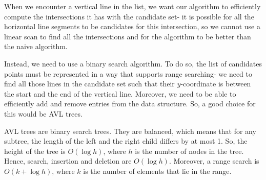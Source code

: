 \documentclass[a4paper, openany]{memoir}
\begin{document}
\begin{figure}[H]
    \centering
\end{figure}

When we encounter a vertical line in the list, we want our algorithm to efficiently compute the intersections it has with the candidate set- it is possible for all the horizontal line segments to be candidates for this intersection, so we cannot use a linear scan to find all the intersections and for the algorithm to be better than the naive algorithm. 

Instead, we need to use a binary search algorithm. To do so, the list of candidates points must be represented in a way that supports range searching- we need to find all those lines in the candidate set such that their $y$-coordinate is between the start and the end of the vertical line. Moreover, we need to be able to efficiently add and remove entries from the data structure. So, a good choice for this would be AVL trees.

AVL trees are binary search trees. They are balanced, which means that for any subtree, the length of the left and the right child differs by at most 1. So, the height of the tree is $O(\log h)$, where $h$ is the number of nodes in the tree. Hence, search, insertion and deletion are $O(\log h)$. Moreover, a range search is $O(k + \log h)$, where $k$ is the number of elements that lie in the range.
\end{document}

